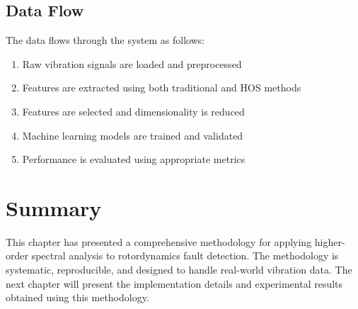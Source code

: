 \subsection{Data Flow}

The data flows through the system as follows:

\begin{enumerate}
    \item Raw vibration signals are loaded and preprocessed
    \item Features are extracted using both traditional and HOS methods
    \item Features are selected and dimensionality is reduced
    \item Machine learning models are trained and validated
    \item Performance is evaluated using appropriate metrics
\end{enumerate}

\section{Summary}

This chapter has presented a comprehensive methodology for applying higher-order spectral analysis to rotordynamics fault detection. The methodology is systematic, reproducible, and designed to handle real-world vibration data. The next chapter will present the implementation details and experimental results obtained using this methodology.
